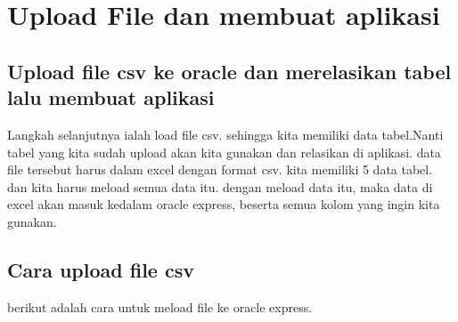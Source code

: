 \chapter*{Upload File dan membuat aplikasi}
\section*{Upload file csv ke oracle dan merelasikan tabel lalu membuat aplikasi}
Langkah selanjutnya ialah load file csv. sehingga kita memiliki data tabel.Nanti tabel yang kita sudah upload akan kita gunakan dan relasikan di aplikasi. data file tersebut harus dalam excel dengan format csv. kita memiliki 5 data tabel. dan kita harus meload semua data itu. dengan meload data itu, maka data di excel akan masuk kedalam oracle express, beserta semua kolom yang ingin kita gunakan.
\section{Cara upload file csv}
berikut adalah cara untuk meload file ke oracle express.

